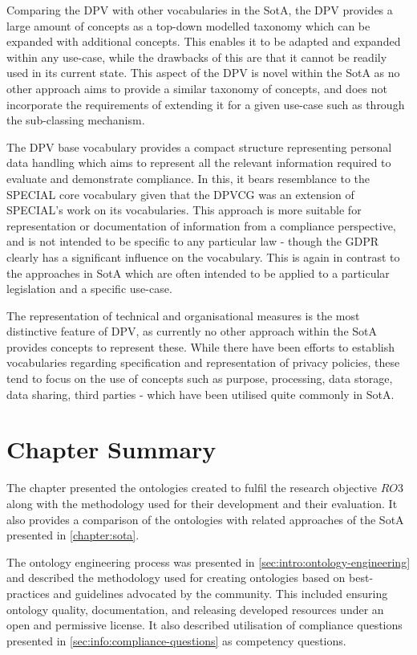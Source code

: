 Comparing the DPV with other vocabularies in the SotA, the DPV provides a large amount of concepts as a top-down modelled taxonomy which can be expanded with additional concepts. This enables it to be adapted and expanded within any use-case, while the drawbacks of this are that it cannot be readily used in its current state.
This aspect of the DPV is novel within the SotA as no other approach aims to provide a similar taxonomy of concepts, and does not incorporate the requirements of extending it for a given use-case such as through the sub-classing mechanism.

The DPV base vocabulary provides a compact structure representing personal data handling which aims to represent all the relevant information required to evaluate and demonstrate compliance.
In this, it bears resemblance to the SPECIAL core vocabulary \cite{bonatti_special_2018-2} given that the DPVCG was an extension of SPECIAL's work on its vocabularies.
This approach is more suitable for representation or documentation of information from a compliance perspective, and is not intended to be specific to any particular law - though the GDPR clearly has a significant influence on the vocabulary.
This is again in contrast to the approaches in SotA which are often intended to be applied to a particular legislation and a specific use-case.

The representation of technical and organisational measures is the most distinctive feature of DPV, as currently no other approach within the SotA provides concepts to represent these.
While there have been efforts to establish vocabularies regarding specification and representation of privacy policies, these tend to focus on the use of concepts such as purpose, processing, data storage, data sharing, third parties - which have been utilised quite commonly in SotA.

\section*{Chapter Summary}
The chapter presented the ontologies created to fulfil the research objective $RO3$ along with the methodology used for their development and their evaluation. It also provides a comparison of the ontologies with related approaches of the SotA presented in \autoref{chapter:sota}.

The ontology engineering process was presented in \autoref{sec:intro:ontology-engineering} and described the methodology used for creating ontologies based on best-practices and guidelines advocated by the community. This included ensuring ontology quality, documentation, and releasing developed resources under an open and permissive license.
It also described utilisation of compliance questions presented in \autoref{sec:info:compliance-questions} as competency questions.

